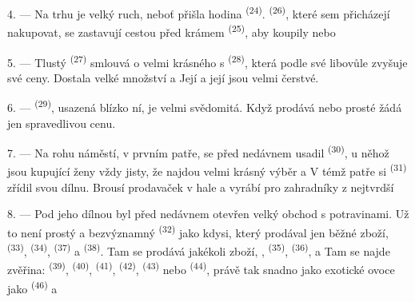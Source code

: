 \VUsaut{4.0mm}
\VUsaut{3.0mm}

4. --- Na trhu je velký ruch, neboť přišla hodina 
\textsuperscript{(24)}.  \textsuperscript{(26)}, které sem přicházejí
nakupovat, se zastavují cestou před krámem 
\textsuperscript{(25)}, aby koupily  nebo 

5. --- Tlustý  \textsuperscript{(27)} smlouvá o velmi krásného
 s  \textsuperscript{(28)}, která podle své
libovůle zvyšuje své ceny. Dostala velké množství  a  Její  a její  jsou velmi
čerstvé.

\VUsaut{4.0mm}
\VUsaut{3.0mm}

6. ---  \textsuperscript{(29)}, usazená blízko ní, je velmi
svědomitá. Když prodává  nebo prosté  žádá
jen spravedlivou cenu.

7. --- Na rohu náměstí, v prvním patře, se před nedávnem usadil  \textsuperscript{(30)}, u něhož jsou kupující ženy vždy jisty, že najdou velmi
krásný výběr   a  V témž
patře si  \textsuperscript{(31)} zřídil svou dílnu. Brousí 
prodavaček v hale a vyrábí pro zahradníky  z nejtvrdší

\VUsaut{4.0mm}
\VUsaut{3.0mm}

8. --- Pod jeho dílnou byl před nedávnem otevřen velký obchod s potravinami. Už to není
prostý a bezvýznamný  \textsuperscript{(32)} jako kdysi, který
prodával jen běžné zboží,  \textsuperscript{(33)}, 
\textsuperscript{(34)},  \textsuperscript{(37)} a 
\textsuperscript{(38)}. Tam se prodává jakékoli zboží, ,
 \textsuperscript{(35)},  \textsuperscript{(36)},
  a  Tam se najde zvěřina:
 \textsuperscript{(39)},  \textsuperscript{(40)},
 \textsuperscript{(41)},  \textsuperscript{(42)},
 \textsuperscript{(43)} nebo 
\textsuperscript{(44)}, právě tak snadno jako exotické ovoce jako 
\textsuperscript{(46)} a 

